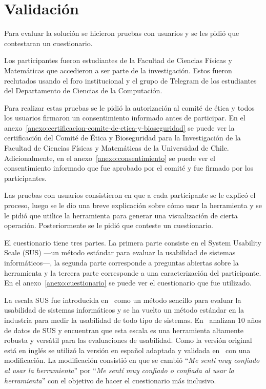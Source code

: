 \chapter{Validación}

Para evaluar la solución se hicieron pruebas con usuarios y se les pidió que contestaran un cuestionario. 

Los participantes fueron estudiantes de la Facultad de Ciencias Físicas y Matemáticas que accedieron a ser parte de la investigación. Estos fueron reclutados usando el foro institucional y el grupo de Telegram de los estudiantes del Departamento de Ciencias de la Computación.

Para realizar estas pruebas se le pidió la autorización al comité de ética y todos los usuarios firmaron un consentimiento informado antes de participar. En el anexo~\ref{anexo:certificacion-comite-de-etica-y-bioseguridad} se puede ver la certificación del Comité de Ética y Bioseguridad para la Investigación de la Facultad de Ciencias Físicas y Matemáticas de la Universidad de Chile. Adicionalmente, en el anexo~\ref{anexo:consentimiento} se puede ver el consentimiento informado que fue aprobado por el comité y fue firmado por los participantes.

Las pruebas con usuarios consistieron en que a cada participante se le explicó el proceso, luego se le dio una breve explicación sobre cómo usar la herramienta y se le pidió que utilice la herramienta para generar una visualización de cierta operación. Posteriormente se le pidió que conteste un cuestionario.

El cuestionario tiene tres partes. La primera parte consiste en el System Usability Scale (SUS) ---un método estándar para evaluar la usabilidad de sistemas informáticos---, la segunda parte corresponde a preguntas abiertas sobre la herramienta y la tercera parte corresponde a una caracterización del participante. En el anexo~\ref{anexo:cuestionario} se puede ver el cuestionario que fue utilizado.

La escala SUS fue introducida en~\cite{brooke1996quick} como un método sencillo para evaluar la usabilidad de sistemas informáticos y se ha vuelto un método estándar en la industria para medir la usabilidad de todo tipo de sistemas. En~\cite{evaluation-of-sus} analizan 10 años de datos de SUS y encuentran que esta escala es una herramienta altamente robusta y versátil para las evaluaciones de usabilidad. Como la versión original está en inglés se utilizó la versión en español adaptada y validada en~\cite{spanish-sus} con una modificación. La modificación consistió en que se cambió ``\textit{Me sentí muy confiado al usar la herramienta}'' por ``\textit{Me sentí muy confiado o confiada al usar la herramienta}'' con el objetivo de hacer el cuestionario más inclusivo.

